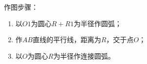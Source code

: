 \begin{enumerate}
\begin{enumerate}
作图步骤：
\begin{enumerate}
\item 以$O1$为圆心$R+R1$为半径作圆弧；
\item 作$AB$直线的平行线，距离为$R$，交于点$O$；
\item 以$O$为圆心$R$为半径作连接圆弧。
\end{enumerate}
\end{enumerate}
\end{enumerate}